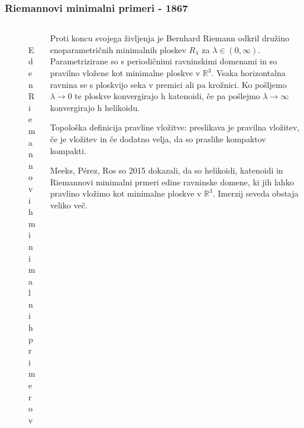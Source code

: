 \documentclass[8pt]{beamer}
\theoremstyle{definition}
\theoremstyle{remark}
\theoremstyle{plain}
\numberwithin{equation}{section}  %
\begin{document}
\begin{frame}
    \frametitle{Riemannovi minimalni primeri - 1867}

    \begin{columns}
        \begin{column}{0.4\textwidth}
            \centering
            \begin{figure}
                \includegraphics[width=16em]{../Slike/Riemann_Minimal_Example.png}
                \caption{Eden Riemannovih minimalnih primerov}
            \end{figure}
        \end{column}

        \begin{column}{0.6\textwidth}
            Proti koncu svojega življenja je Bernhard Riemann odkril družino enoparametričnih minimalnih ploskev $R_\lambda$ za $\lambda \in (0, \infty)$. Parametrizirane so s periodičnimi ravninskimi domenami in so \textcolor{red1}{pravilno vložene} kot minimalne ploskve v $\mathbb{R}^3$. Vsaka horizontalna ravnina se s ploskvijo seka v premici ali pa krožnici. Ko pošljemo $\lambda \rightarrow 0$ te ploskve konvergirajo h katenoidi, če pa pošlejmo $\lambda \rightarrow \infty$ konvergirajo h helikoidu. 

            \vspace{0.8em}

            \textcolor{red1}{Topološka definicija pravline vložitve:} preslikava je pravilna vložitev, če je vložitev in če dodatno velja, da so praslike kompaktov kompakti.
            
            \vspace{0.8em}

            Meeks, Pérez, Ros so 2015 dokazali, da so helikoidi, katenoidi in Riemannovi minimalni prmeri edine ravninske domene, ki jih lahko pravlino vložimo kot minimalne ploskve v $\mathbb{R}^3$. Imerzij seveda obstaja veliko več. 
        \end{column}
    \end{columns}
    
\end{frame}
\end{document}
